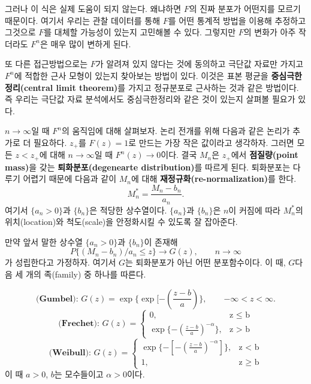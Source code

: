 \documentclass[b5paper,]{scrbook}
\theoremstyle{plain}
\theoremstyle{definition}
\numberwithin{equation}{section}
\let\BeginKnitrBlock\begin \let\EndKnitrBlock\end
\begin{document}
그러나 이 식은 실제 도움이 되지 않는다. 왜냐하면 \(F\)의 진짜 분포가 어떤지를 모르기 때문이다. 여기서 우리는 관찰 데이터를 통해 \(F\)를 어떤 통계적 방법을 이용해 추정하고 그것으로 \(F\)를 대체할 가능성이 있는지 고민해볼 수 있다. 그렇지만 \(F\)의 변화가 아주 작더라도 \(F^{n}\)은 매우 많이 변하게 된다.

또 다른 접근방법으로는 \(F\)가 알려져 있지 않다는 것에 동의하고 극단값 자료만 가지고 \(F^{n}\)에 적합한 근사 모형이 있는지 찾아보는 방법이 있다. 이것은 표본 평균을 \textbf{중심극한정리(central limit theorem)}를 가지고 정규분포로 근사하는 것과 같은 방법이다. 즉 우리는 극단값 자료 분석에서도 중심극한정리와 같은 것이 있는지 살펴볼 필요가 있다.

\(n \rightarrow \infty\)일 때 \(F^{n}\)의 움직임에 대해 살펴보자. 논리 전개를 위해 다음과 같은 논리가 추가로 더 필요하다. \(z_{+}\)를 \(F(z)=1\)로 만드는 가장 작은 값이라고 생각하자. 그러면 모든 \(z < z_{+}\)에 대해 \(n \rightarrow \infty\)일 때 \(F^{n}(z) \rightarrow 0\)이다. 결국 \(M_{n}\)은 \(z_{+}\)에서 \textbf{점질량(point mass)}을 갖는 \textbf{퇴화분포(degenearte distribution)}를 따르게 된다. 퇴화분포는 다루기 어렵기 때문에 다음과 같이 \(M_{n}\)에 대해 \textbf{재정규화(re-normalization)}를 한다.
\[M_{n}^{*}=\frac{M_{n}-b_{n}}{a_{n}}.\]
여기서 \(\{a_{n} >0\}\)과 \(\{b_{n}\}\)은 적당한 상수열이다. \(\{a_{n}\}\)과 \(\{b_{n}\}\)은 \(n\)이 커짐에 따라 \(M_{n}^{*}\)의 위치(location)와 척도(scale)을 안정화시킬 수 있도록 잘 잡아준다.

\BeginKnitrBlock{theorem}[일반화 극단값 분포 정리]
\protect\hypertarget{thm:unnamed-chunk-422}{}{\label{thm:unnamed-chunk-422} {} }만약 앞서 말한 상수열 \(\{a_{n} >0\}\)과 \(\{b_{n}\}\)이 존재해
\[P\{(M_{n}-b_{n})/a_{n}\leq z\} \rightarrow G(z), \qquad{n \rightarrow \infty}\]
가 성립한다고 가정하자. 여기서 \(G\)는 퇴화분포가 아닌 어떤 분포함수이다. 이 때, \(G\)다음 세 개의 족(family) 중 하나를 따른다.

\[\textbf{(Gumbel): }G(z)=\exp\{\exp[-(\frac{z-b}{a})\}, \qquad{-\infty < z < \infty}.\]
\[\textbf{(Frechet): }G(z)=
\begin{cases}
0, & \text{z $\leq$ b}\\
\exp\{-(\frac{z-b}{a})^{-\alpha}\}, & \text{z > b}
\end{cases}\]
\[\textbf{(Weibull): }G(z)=
\begin{cases}
\exp\{-[-(\frac{z-b}{a})^{-\alpha}]\}, & \text{z < b}\\
1, & \text{z $\geq$ b}
\end{cases}\]
이 때 \(a>0\), \(b\)는 모수들이고 \(\alpha >0\)이다.
\EndKnitrBlock{theorem}
\end{document}

